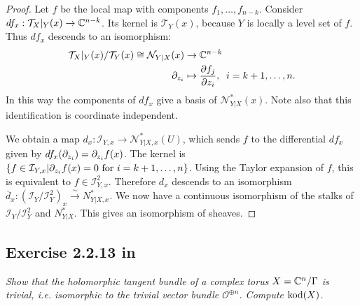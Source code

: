 \documentclass{article}
\begin{document}
\begin{proof}
Let $f$ be the local map with components $f_1, \dots, f_{n-k}$. Consider $df_x : \mathcal{T}_X|_Y(x)
\to \mathbb{C}^{n-k}$. Its kernel is $\mathcal{T}_Y(x)$, because $Y$ is locally a level set of $f$. Thus
$df_x$ descends to an isomorphism:
\begin{align*}
\mathcal{T}_X|_Y(x) / \mathcal{T}_Y(x) \cong \mathcal{N}_{Y|X}(x) &\to \mathbb{C}^{n-k} \\
\partial_{z_i} &\mapsto \frac{\partial f_j}{\partial z_i}, \;\; i= k+1, \dots, n.
\end{align*}
In this way the components of $df_x$ give a basis of $\mathcal{N}^*_{Y|X}(x)$. Note also that this identification
is coordinate independent.

We obtain a map $d_x : \mathcal{I}_{Y,x} \to \mathcal{N}^*_{Y|X, x}(U)$, which sends $f$ to the differential
$df_x$ given by $df_x(\partial_{z_i}) = \partial_{z_i}f(x)$. The kernel is $\{f \in \mathcal{I}_{Y,x}| \partial_{z_i}f (x)= 0 
\text{ for } 
i = k+1, \dots, n\}$. Using the Taylor expansion of $f$, this is equivalent to $f \in \mathcal{I}_{Y,x}^2$.
Therefore $d_x$ descends to an isomorphism $\bar d_x : (\mathcal{I}_Y/\mathcal{I}^2_Y)_x \overset{\sim}{\to}
{N}^*_{Y|X,x}$. We now have a continuous isomorphism of the stalks of $\mathcal{I}_Y/\mathcal{I}^2_Y$ and 
${N}^*_{Y|X}$. This gives an isomorphism of sheaves. 
\end{proof}


\subsection*{Exercise 2.2.13 in \cite{Huy}}
\emph{Show that the holomorphic tangent bundle of a complex torus $X= \mathbb{C}^n/\Gamma$ is trivial, i.e. isomorphic
to the trivial vector bundle $\mathcal{O}^{\oplus n}$. Compute $\operatorname{kod}(X)$.}
\end{document}

